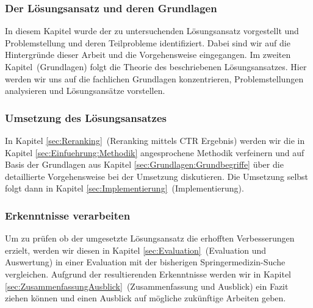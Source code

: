 \subsubsection{Der Lösungsansatz und deren Grundlagen}
\label{sec:Einfuehrung:GliederungAufbau:Loesungsansatz}

In diesem Kapitel wurde der zu untersuchenden Lösungsansatz vorgestellt und Problemstellung und deren Teilprobleme identifiziert. Dabei sind wir auf die Hintergründe dieser Arbeit und die Vorgehensweise eingegangen. Im zweiten Kapitel~(Grundlagen) folgt die Theorie des beschriebenen Lösungsansatzes. Hier werden wir uns auf die fachlichen Grundlagen konzentrieren, Problemstellungen analysieren und Lösungsansätze vorstellen.

\subsubsection{Umsetzung des Lösungsansatzes}
\label{sec:Einfuehrung:GliederungAufbau:Umsetzung}

In Kapitel \ref{sec:Reranking}~(Reranking mittels CTR Ergebnis) werden wir die in Kapitel \ref{sec:Einfuehrung:Methodik} angesprochene Methodik verfeinern und auf Basis der Grundlagen aus Kapitel \ref{sec:Grundlagen:Grundbegriffe} über die detaillierte Vorgehensweise bei der Umsetzung diskutieren. Die Umsetzung selbst folgt dann in Kapitel \ref{sec:Implementierung}~(Implementierung).

\subsubsection{Erkenntnisse verarbeiten}
\label{sec:Einfuehrung:GliederungAufbau:Erkenntnisse}

Um zu prüfen ob der umgesetzte Lösungsansatz die erhofften Verbesserungen erzielt, werden wir diesen in Kapitel \ref{sec:Evaluation}~(Evaluation und Auswertung) in einer Evaluation mit der bisherigen Springermedizin-Suche vergleichen. Aufgrund der resultierenden Erkenntnisse werden wir in Kapitel \ref{sec:ZusammenfassungAusblick}~(Zusammenfassung und Ausblick) ein Fazit ziehen können und einen Ausblick auf mögliche zukünftige Arbeiten geben.